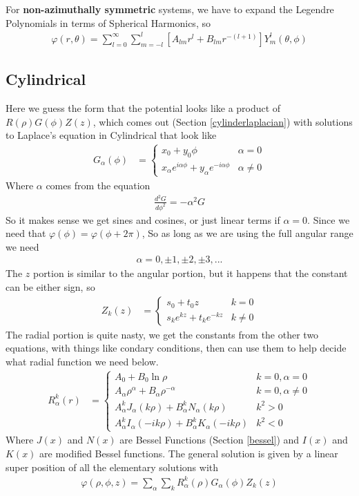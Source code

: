 For \textbf{non-azimuthally symmetric} systems, we have to expand the Legendre Polynomials in terms of Spherical Harmonics, so
\begin{align}
\varphi(r,\theta)=\sum_{l=0}^\infty\sum_{m=-l}^l [A_{lm} r^l+B_{lm}r^{-(l+1)}]Y^l_m(\theta,\phi)
\end{align}




\subsection{Cylindrical}\label{cylinderlaplace}
Here we guess the form that the potential looks like a product of $R(\rho)G(\phi)Z(z)$, which comes out (Section \ref{cylinderlaplacian}) with solutions to Laplace's equation in Cylindrical that look like
\begin{align}
G_\alpha(\phi) &= \begin{cases}
x_0 + y_0\phi &\alpha = 0\\
x_\alpha e^{i\alpha \phi} + y_\alpha e^{-i\alpha \phi} &\alpha \neq 0
\end{cases}
\end{align}
Where $\alpha$ comes from the equation
\begin{align}
\frac{d^2G}{d\phi^2} =  -\alpha^2 G
\end{align}
So it makes sense we get sines and cosines, or just linear terms if $\alpha = 0$. Since we need that $\varphi(\phi) = \varphi(\phi+2\pi)$, So as long as we are using the full angular range we need
\begin{align}
\alpha = 0,\pm 1,\pm 2, \pm 3, ... 
\end{align}
The $z$ portion is similar to the angular portion, but it happens that the constant can be either sign, so
\begin{align}
Z_k(z) &= \begin{cases}
s_0 + t_0 z &k = 0\\
s_k e^{kz} + t_k e^{-k z} &k \neq 0
\end{cases}
\end{align}
The radial portion is quite nasty, we get the constants from the other two equations, with things like condary conditions, then can use them to help decide what radial function we need below.
\begin{align}
R^k_\alpha(r) &= \begin{cases}
A_0 + B_0\ln\rho &k=0, \alpha = 0\\
A_\alpha \rho^\alpha  + B_\alpha \rho^{-\alpha} &k = 0, \alpha \neq 0\\
A_\alpha^kJ_\alpha(k\rho) + B_\alpha^kN_\alpha(k\rho) & k^2 > 0\\
A_\alpha^kI_\alpha(-ik\rho) + B_\alpha^kK_\alpha(-ik\rho) & k^2 < 0
\end{cases}
\end{align}
Where $J(x)$ and $N(x)$ are Bessel Functions (Section \ref{bessel}) and $I(x)$ and $K(x)$ are modified Bessel functions. The general solution is given by a linear super position of all the elementary solutions with
\begin{align}
\varphi(\rho,\phi,z) = \sum_\alpha\sum_k R_\alpha^k(\rho)G_\alpha(\phi)Z_k(z)
\end{align}


